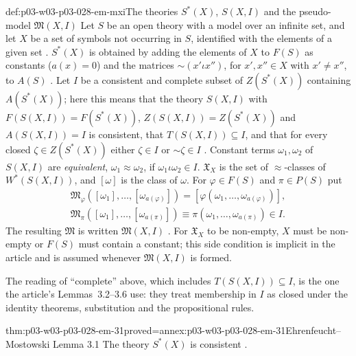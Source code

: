 \begin{hbdefinition}{def:p03-w03-p03-028-em-mxi}{The theories \(S^*(X)\), \(S(X,I)\) and the pseudo-model \(\mathfrak M(X,I)\)}
Let \(S\) be an open theory with a model over an infinite set, and let \(X\)
be a set of symbols not occurring in \(S\), identified with the elements of a
given set \cite[p.~53]{EhrenfeuchtMostowski1956}.  \(S^*(X)\) is obtained by
adding the elements of \(X\) to \(F(S)\) as constants (\(a(x)=0\)) and the
matrices \(\mathord\sim(x'\iota x'')\), for \(x',x''\in X\) with
\(x'\neq x''\), to \(A(S)\) \cite[p.~53]{EhrenfeuchtMostowski1956}.  Let
\(I\) be a consistent and complete subset of \(Z(S^*(X))\) containing
\(A(S^*(X))\); here this means that the theory \(S(X,I)\) with
\(F(S(X,I))=F(S^*(X))\), \(Z(S(X,I))=Z(S^*(X))\) and \(A(S(X,I))=I\) is
consistent, that \(T(S(X,I))\subseteq I\), and that for every closed
\(\zeta\in Z(S^*(X))\) either \(\zeta\in I\) or \(\mathord\sim\zeta\in I\)
\cite[p.~54]{EhrenfeuchtMostowski1956}.  Constant terms \(\omega_1,\omega_2\)
of \(S(X,I)\) are \emph{equivalent}, \(\omega_1\approx\omega_2\), if
\(\omega_1\iota\omega_2\in I\).  \(\mathfrak X_X\) is the set of
\(\approx\)-classes of \(W^*(S(X,I))\), and \([\omega]\) is the class of
\(\omega\).  For \(\varphi\in F(S)\) and \(\pi\in P(S)\) put
\cite[p.~54]{EhrenfeuchtMostowski1956}
\begin{gather*}
  \mathfrak M_\varphi([\omega_1],\ldots,[\omega_{a(\varphi)}])
   =[\varphi(\omega_1,\ldots,\omega_{a(\varphi)})],\\
  \mathfrak M_\pi([\omega_1],\ldots,[\omega_{a(\pi)}])
   \equiv\pi(\omega_1,\ldots,\omega_{a(\pi)})\in I .
\end{gather*}
The resulting \(\mathfrak M\) is written \(\mathfrak M(X,I)\)
\cite[p.~55]{EhrenfeuchtMostowski1956}.  For \(\mathfrak X_X\) to be non-empty,
\(X\) must be non-empty or \(F(S)\) must contain a constant; this side
condition is implicit in the article and is assumed whenever
\(\mathfrak M(X,I)\) is formed.
\end{hbdefinition}

The reading of ``complete'' above, which includes \(T(S(X,I))\subseteq I\), is
the one the article's Lemmas~3.2--3.6 use: they treat membership in \(I\) as
closed under the identity theorems, substitution and the propositional rules.

\begin{hblemma}{thm:p03-w03-p03-028-em-31}{proved=annex:p03-w03-p03-028-em-31}{Ehrenfeucht--Mostowski Lemma 3.1}
The theory \(S^*(X)\) is consistent
\cite[Lemma~3.1, p.~54]{EhrenfeuchtMostowski1956}.
\end{hblemma}


